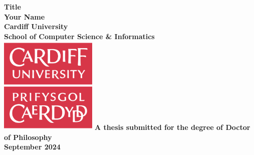 \documentclass[a4paper,oneside,onecolumn,openright,12pt]{book} %
\begin{document}
\frontmatter

\begin{titlepage}

\begin{center}
\vspace*{3ex}
\textbf{\Huge Title}\\
\vfill
\textbf{\LARGE Your Name}\\[2ex]
\textbf{\large Cardiff University}\\
\textbf{\large School of Computer Science \& Informatics}\\
\vfill
\includegraphics[width=0.35\textwidth]{media/cardiff_uni_logo.png}
\vfill
\textbf{\large A thesis submitted for the degree of Doctor of Philosophy}\\[1ex]
\textbf{\large September 2024}\\
\end{center}

\end{titlepage}

\cleardoublepage



\def\baselinestretch{1.5}\normalfont

\tableofcontents

\listoffigures
\listoftables
\listofalgorithms




\cleardoublepage



\cleardoublepage



\cleardoublepage

\mainmatter



\backmatter

\def\baselinestretch{1}\normalfont
\def\baselinestretch{1.24}\normalfont


\end{document}
